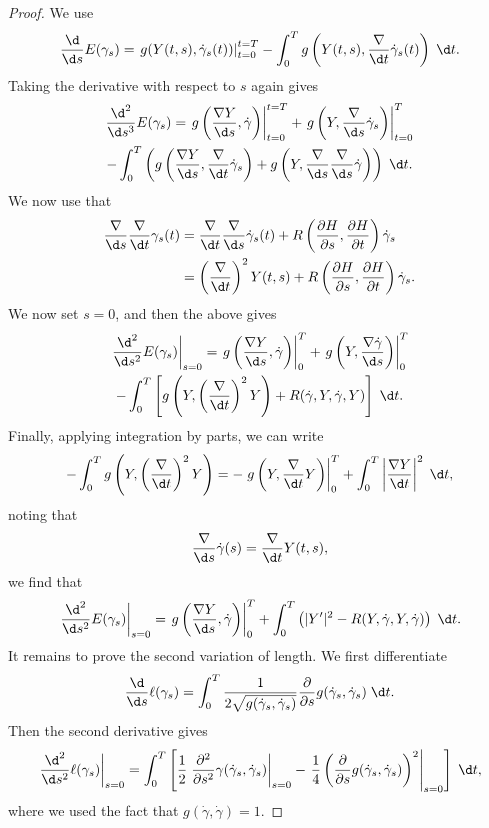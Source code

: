 \documentclass[a4paper]{article}
\begin{document}
\begin{proof}
  We use
  \[
    \frac{\d}{\d s}E(\gamma_s) = \left.g(Y(t, s), \dot{\gamma}_s(t))\right|_{t = 0}^{t = T} - \int_0^T g\left(Y(t, s), \frac{\nabla}{\d t} \dot{\gamma}_s(t)\right)\;\d t.
  \]
  Taking the derivative with respect to $s$ again gives
  \begin{multline*}
    \frac{\d^2}{\d s^3}E(\gamma_s) =\left. g\left(\frac{\nabla Y}{\d s}, \dot{\gamma}\right)\right|_{t = 0}^{t = T} + \left.g\left(Y, \frac{\nabla}{\d s} \dot{\gamma}_s\right)\right|_{t = 0}^{T} \\
    - \int_0^T \left(g\left(\frac{\nabla Y}{\d s}, \frac{\nabla}{\d t} \dot{\gamma}_s\right) + g\left(Y, \frac{\nabla}{\d s} \frac{\nabla}{\d s} \dot{\gamma}\right)\right)\;\d t.
  \end{multline*}
  We now use that
  \begin{align*}
    \frac{\nabla}{\d s} \frac{\nabla}{\d t} \gamma_s(t) &= \frac{\nabla}{\d t} \frac{\nabla}{\d s} \dot{\gamma}_s(t) + R\left(\frac{\partial H}{\partial s}, \frac{\partial H}{\partial t}\right)\dot{\gamma}_s\\
    &= \left(\frac{\nabla}{\d t}\right)^2 Y(t, s) + R\left(\frac{\partial H}{\partial s}, \frac{\partial H}{\partial t}\right)\dot{\gamma}_s.
  \end{align*}
  We now set $s = 0$, and then the above gives
  \begin{multline*}
    \left.\frac{\d^2}{\d s^2} E(\gamma_s)\right|_{s = 0} = \left.g\left(\frac{\nabla Y}{\d s}, \dot{\gamma}\right)\right|_0^T + \left.g\left(Y, \frac{\nabla \dot{\gamma}}{\d s}\right)\right|_0^T \\
    - \int_0^T \left[g\left(Y, \left(\frac{\nabla}{\d t}\right)^2 Y\right) + R(\dot{\gamma}, Y, \dot{\gamma}, Y)\right]\;\d t.
  \end{multline*}
  Finally, applying integration by parts, we can write
  \[
    -\int_0^T g\left(Y, \left(\frac{\nabla}{\d t}\right)^2 Y\right) = - \left.g\left(Y, \frac{\nabla}{\d t}Y\right)\right|_0^T + \int_0^T \left|\frac{\nabla Y}{\d t}\right|^2\;\d t,
  \]
  noting that
  \[
    \frac{\nabla}{\d s} \dot{\gamma}(s) = \frac{\nabla}{\d t} Y(t, s),
  \]
  we find that
  \[
    \left.\frac{\d^2}{\d s^2} E(\gamma_s)\right|_{s = 0} = \left.g\left(\frac{\nabla Y}{\d s}, \dot{\gamma}\right)\right|_0^T + \int_0^T \left(|Y'|^2 - R(Y, \dot{\gamma}, Y, \dot{\gamma})\right)\;\d t.
  \]
  It remains to prove the second variation of length. We first differentiate
  \[
    \frac{\d}{\d s}\ell(\gamma_s) = \int_0^T \frac{1}{2 \sqrt{g(\dot{\gamma}_s, \dot{\gamma}_s)}} \frac{\partial}{\partial s} g(\dot{\gamma}_s, \dot{\gamma}_s)\;\d t.
  \]
  Then the second derivative gives
  \[
    \left.\frac{\d^2}{\d s^2} \ell(\gamma_s) \right|_{s = 0} = \int_0^T \left[\frac{1}{2} \left.\frac{\partial^2}{\partial s^2} \gamma(\dot{\gamma}_s, \dot{\gamma}_s) \right|_{s = 0} - \left.\frac{1}{4} \left(\frac{\partial}{\partial s} g(\dot{\gamma}_s, \dot{\gamma}_s)\right)^2\right|_{s = 0}\right]\;\d t,
  \]
  where we used the fact that $g(\dot{\gamma}, \dot{\gamma}) = 1$.


\end{proof}
\end{document}

